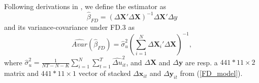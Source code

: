 \documentclass[11pt]{article}
\begin{document}
Following derivations in \cite{Wooldrige_2010_10}, we define the estimator as 
\begin{equation}
    \widehat{\beta}_{FD} = \left(\Delta \textbf{X}'\Delta \textbf{X}\right)^{-1}\Delta \textbf{X}'\Delta y
\end{equation}
and its variance-covariance under FD.3 as
\begin{equation}
    \widehat{Avar}(\widehat{\beta}_{FD})= \hat{\sigma}_u^2\left(\sum_{i=1}^N\Delta\textbf{X}_i'\Delta\textbf{X}\right)^{-1},
\end{equation}
where $\hat{\sigma}_u^2=\frac{1}{NT-N-K}\sum_{i=1}^N\sum_{t=1}^T\widehat{\Delta u}_{it}^2$, and $\Delta\textbf{X}$ and $\Delta\textbf{y}$ are resp. a $441*11\times2$ matrix and $441*11\times1$ vector of stacked $\Delta\textbf{x}_{it}$ and $\Delta\textbf{y}_{it}$ from (\ref{FD_model}).
\end{document}
